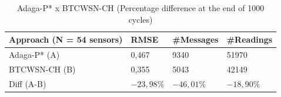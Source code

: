 \documentclass[conference]{IEEEtran}
\begin{document}
\begin{table}[h!]
\caption{Adaga-P* x BTCWSN-CH (Percentage difference at the end of 1000 cycles)}
\begin{center}
\begin{tabular}{|l||l|l|l|}
\hline
Approach (N = 54 sensors) &RMSE &\#Messages &\#Readings \\
\hline\hline
Adaga-P* (A) &0,467 &9340 &51970 \\
\hline
BTCWSN-CH (B) &0,355 &5043 &42149 \\
\hline
Diff (A-B) &$-23,98\%$ &$-46,01\%$ &$-18,90\%$ \\
\hline
\end{tabular}
\end{center}
\end{table}

%
%



%
%
\end{document}
